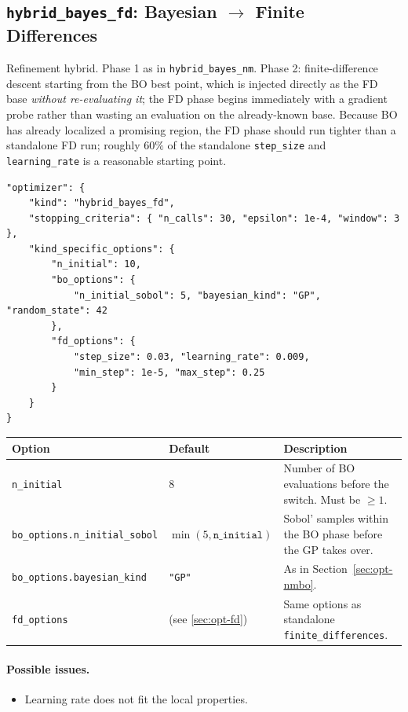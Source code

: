 \subsection{\texttt{hybrid\_bayes\_fd}: Bayesian $\to$ Finite Differences}
\label{sec:opt-bofd}

Refinement hybrid.  Phase 1 as in \texttt{hybrid\_bayes\_nm}.  Phase 2:
finite-difference descent starting from the BO best point, which is injected
directly as the FD base \emph{without re-evaluating it}; the FD phase
begins immediately with a gradient probe rather than wasting an evaluation
on the already-known base.  Because BO has already localized a promising
region, the FD phase should run tighter than a standalone FD run; roughly
$60\%$ of the standalone \texttt{step\_size} and \texttt{learning\_rate} is
a reasonable starting point.

\begin{lstlisting}
"optimizer": {
    "kind": "hybrid_bayes_fd",
    "stopping_criteria": { "n_calls": 30, "epsilon": 1e-4, "window": 3 },
    "kind_specific_options": {
        "n_initial": 10,
        "bo_options": {
            "n_initial_sobol": 5, "bayesian_kind": "GP", "random_state": 42
        },
        "fd_options": {
            "step_size": 0.03, "learning_rate": 0.009,
            "min_step": 1e-5, "max_step": 0.25
        }
    }
}
\end{lstlisting}

\begin{center}
\begin{tabular}{@{}llp{7.6cm}@{}}
\toprule
Option & Default & Description \\
\midrule
\texttt{n\_initial} & 8 & Number of BO evaluations before the switch.
Must be $\geq 1$. \\
\texttt{bo\_options.n\_initial\_sobol} & $\min(5, \texttt{n\_initial})$ &
Sobol' samples within the BO phase before the GP takes over. \\
\texttt{bo\_options.bayesian\_kind} & \texttt{"GP"} & As in
Section~\ref{sec:opt-nmbo}. \\
\texttt{fd\_options} & (see \ref{sec:opt-fd}) & Same options as standalone
\texttt{finite\_differences}. \\
\bottomrule
\end{tabular}
\end{center}

\paragraph{Possible issues.}
\begin{itemize}
  \item Learning rate does not fit the local properties.
\end{itemize}


